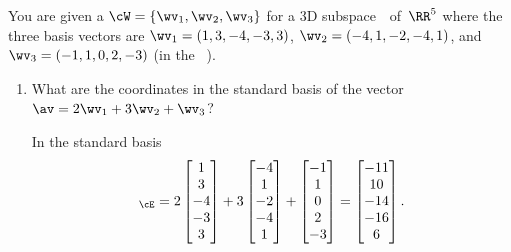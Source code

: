 \begin{example} \label{eg:}
You are given a  \(\cW=\{\wv_1,\wv_2,\wv_3\}\) for a 3D subspace~\WW\ of~\(\RR^5\) where the three basis vectors are
\(\wv_1=(1,3,-4,-3,3)\),
\(\wv_2=(-4,1,-2,-4,1)\), and
\(\wv_3=(-1,1,0,2,-3)\) (in the ~\cE).
\begin{enumerate}
\item What are the coordinates in the standard basis of the vector \(\av=2\wv_1+3\wv_2+\wv_3\)?
\begin{solution} 
In the standard basis
\begin{equation*}
[\av]_\cE=2\begin{bmatrix} 1\\3\\-4\\-3\\3 \end{bmatrix}
+3\begin{bmatrix} -4\\1\\-2\\-4\\1 \end{bmatrix}
+\begin{bmatrix} -1\\1\\0\\2\\-3 \end{bmatrix}
=\begin{bmatrix} -11\\ 10\\-14\\-16\\  6 \end{bmatrix}.
\end{equation*}
\end{solution}


\end{enumerate}
\end{example}
